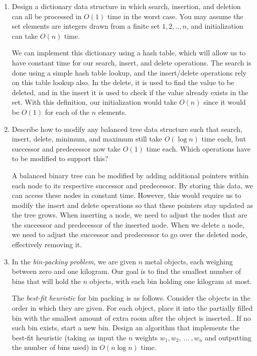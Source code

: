 \documentclass[12pt]{article}
\begin{document}
\begin{enumerate}
    \item Design a dictionary data structure in which search, insertion, and deletion can all be
          processed in $O(1)$ time in the worst case. You may assume the set elements are integers drawn
          from a finite set $1, 2, .., n$, and initialization can take $O(n)$ time.

          We can implement this dictionary using a hash table, which will allow us to have constant time
          for our search, insert, and delete operations. The search is done using a simple hash table
          lookup, and the insert/delete operations rely on this table lookup also. In the delete, it is
          used to find the value to be deleted, and in the insert it is used to check if the value already
          exists in the set. With this definition, our initialization would take $O(n)$ since it would be
          $O(1)$ for each of the $n$ elements.

    \item Describe how to modify any balanced tree data structure such that search, insert, delete,
          minimum, and maximum still take $O(\log n)$ time each, but successor and predecessor now take $O(1)$
          time each. Which operations have to be modified to support this?

          A balanced binary tree can be modified by adding additional pointers within each node
          to its respective successor and predecessor. By storing this data, we can access these
          nodes in constant time. However, this would require us to modify the insert and delete
          operations so that these pointers stay updated as the tree grows. When inserting a node,
          we need to adjust the nodes that are the successor and predecessor of the inserted node.
          When we delete a node, we need to adjust the successor and predecessor to go over the
          deleted node, effectively removing it.
          \pagebreak
    \item In the {\em bin-packing problem}, we are given $n$ metal objects, each weighing between zero and one
          kilogram. Our goal is to find the smallest number of bins that will hold the $n$ objects, with each
          bin holding one kilogram at most.

          The {\em best-fit heuristic} for bin packing is as follows. Consider the objects in the order in which they are
          given. For each object, place it into the partially filled bin with the smallest amount of extra room
          after the object is inserted.. If no such bin exists, start a new bin. Design an algorithm that
          implements the best-fit heuristic (taking as input the $n$ weights $w_1, w_2,\ ...\ , w_n$ and outputting the
          number of bins used) in $O(n\log n)$ time.


\end{enumerate}
\end{document}

